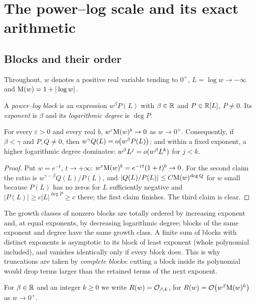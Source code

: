 \section{The power--log scale and its exact arithmetic}
\label{sec:scale}

\subsection{Blocks and their order}

Throughout, $w$ denotes a positive real variable tending to $0^+$, $L=\log w\to-\infty$ and $\mathrm M(w)=1+|\log w|$.

\begin{definition}[Blocks]
A \emph{power--log block} is an expression $w^\beta P(L)$ with $\beta\in\mathbb R$ and $P\in\mathbb R[L]$, $P\ne0$. Its \emph{exponent} is $\beta$ and its \emph{logarithmic degree} is $\deg P$.
\end{definition}

\begin{lemma}
\label{lem:dominance}
For every $\varepsilon>0$ and every real $b$, $w^\varepsilon\mathrm M(w)^b\to0$ as $w\to0^+$. Consequently, if $\beta<\gamma$ and $P,Q\ne0$, then $w^\gamma Q(L)=o\bigl(w^\beta P(L)\bigr)$; and within a fixed exponent, a higher logarithmic degree dominates: $w^\beta L^j=o(w^\beta L^k)$ for $j<k$.
\end{lemma}
\begin{proof}
Put $w=e^{-t}$, $t\to+\infty$: $w^\varepsilon\mathrm M(w)^b=e^{-\varepsilon t}(1+t)^b\to0$. For the second claim the ratio is $w^{\gamma-\beta}Q(L)/P(L)$, and $|Q(L)/P(L)|\le C\mathrm M(w)^{\deg Q}$ for $w$ small because $P(L)$ has no zeros for $L$ sufficiently negative and $|P(L)|\ge c|L|^{\deg P}\ge c$ there; the first claim finishes. The third claim is clear.
\end{proof}

The growth classes of nonzero blocks are totally ordered by increasing exponent and, at equal exponents, by decreasing logarithmic degree; blocks of the same exponent and degree have the same growth class. A finite sum of blocks with distinct exponents is asymptotic to its block of least exponent (whole polynomial included), and vanishes identically only if every block does. This is why truncations are taken by \emph{complete blocks}: cutting a block inside its polynomial would drop terms larger than the retained terms of the next exponent.

\begin{definition}
For $\beta\in\mathbb R$ and an integer $k\ge0$ we write $R(w)=\mathcal O_{\beta,k}$, for $R(w)=\mathcal O\bigl(w^\beta\mathrm M(w)^k\bigr)$ as $w\to0^+$.
\end{definition}

